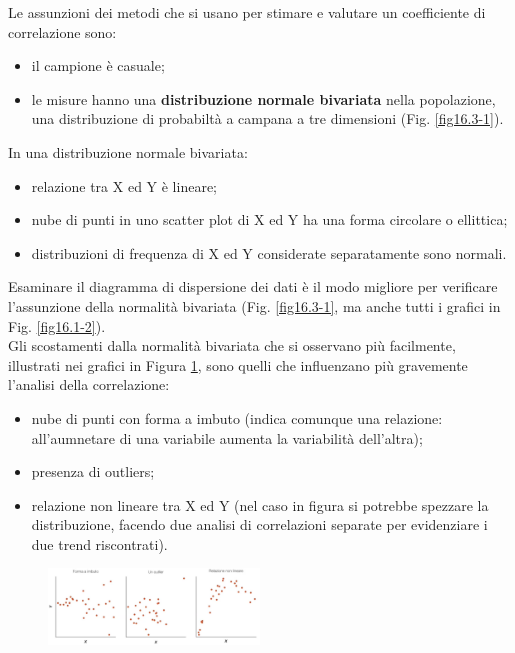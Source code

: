 \documentclass[10pt, draft]{book}
\newcommand{\tightlist}{%
\setlength{\itemsep}{1pt}\setlength{\parskip}{0pt}\setlength{\parsep}{0pt}}
\begin{document}
Le assunzioni dei metodi che si usano per stimare e valutare un coefficiente di correlazione sono:
\begin{itemize}\tightlist
    \item il campione è casuale;
    \item le misure hanno una \textbf{distribuzione normale bivariata} nella popolazione, una distribuzione di probabiltà a campana a tre dimensioni (Fig. \ref{fig16.3-1}).
\end{itemize}

In una distribuzione normale bivariata:
    \begin{itemize}\tightlist
        \item relazione tra X ed Y è lineare;
        \item nube di punti in uno scatter plot di X ed Y ha una forma circolare o ellittica;
        \item distribuzioni di frequenza di X ed Y considerate separatamente sono normali.
    \end{itemize}

Esaminare il diagramma di dispersione dei dati è il modo migliore per verificare l'assunzione della normalità bivariata (Fig. \ref{fig16.3-1}, ma anche tutti i grafici in Fig. \ref{fig16.1-2}).\\
Gli scostamenti dalla normalità bivariata che si osservano più facilmente, illustrati nei grafici in Figura \ref{fig16.3-2}, sono quelli che influenzano più gravemente l'analisi della correlazione:
\begin{itemize}\tightlist
    \item nube di punti con forma a imbuto (indica comunque una relazione: all'aumnetare di una variabile aumenta la variabilità dell'altra);
    \item presenza di outliers;
    \item relazione non lineare tra X ed Y (nel caso in figura si potrebbe spezzare la distribuzione, facendo due analisi di correlazioni separate per evidenziare i due trend riscontrati).
\end{itemize}
\begin{figure}[H]
    \centering
    \includegraphics[width=0.5\textwidth]{fig16.3-2}
    \caption{\small{}}
    \label{fig16.3-2}
\end{figure}
\end{document}
